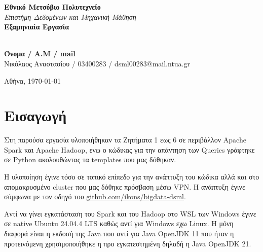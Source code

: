 \documentclass[12pt, a4paper]{article}
\begin{document}
\begin{titlepage}
    \centering
    \vspace*{1.5cm}
    
    {\huge \textbf{Εθνικό Μετσόβιο Πολυτεχνείο}}\\[0.5cm]
    
    {\Large \textit{Επιστήμη Δεδομένων και Μηχανική Μάθηση}}\\[1.5cm]
    
    {\Large \textbf{Εξαμηνιαία Εργασία}}\\[1cm]

     {\Large {}}\\[1cm]

    \begin{flushleft}
        \textbf{Όνομα / Α.Μ / mail}\\
        Νικόλαος Αναστασίου / 03400283 / dsml00283@mail.ntua.gr\\[1.5cm]
        

    \end{flushleft}
    
    \vfill
    
    {\large Αθήνα, \today}
    \vspace*{1cm}
\end{titlepage}


\newpage
\begingroup
\hypersetup{hidelinks}
\tableofcontents
\endgroup
\newpage


\section*{Εισαγωγή}

Στη παρούσα εργασία υλοποιήθηκαν τα Ζητήματα 1 εως 6 σε περιβάλλον Apache Spark και
Apache Hadoop, ενω ο κώδικας για την απάντηση των Queries γράφτηκε σε Python ακολουθώντας
τα templates που μας δόθηκαν.

Η υλοποίηση έγινε τόσο σε τοπικό επίπεδο για την ανάπτυξη του κώδικα
αλλά και στο απομακρυσμένο cluster που μας δόθηκε πρόσβαση μέσω VPN. Η ανάπτυξη 
έγινε σύμφωνα με τον οδηγό του \href{https://github.com/ikons/bigdata-dsml}{github.com/ikons/bigdata-dsml}.

Αντί να γίνει εγκατάσταση του Spark και του Hadoop στο
WSL των Windows έγινε σε native Ubuntu 24.04.4 LTS καθώς αντί για Windows εχω
Linux. Η μόνη διαφορά είναι η εκδοσή της Java που αντί για Java OpenJDK 11 που ήταν η
προτεινόμενη χρησιμοποιήθηκε η προ εγκατεστημένη δηλαδή η Java OpenJDK 21.
\end{document}
